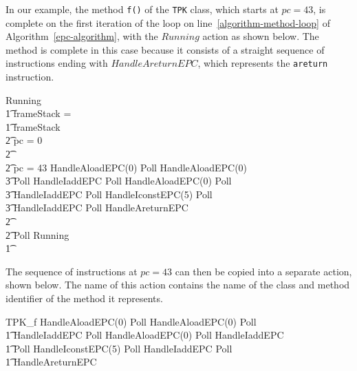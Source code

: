 In our example, the method \texttt{f()} of the \texttt{TPK} class,
which starts at $pc = 43$, is complete on the first iteration of the
loop on line~\ref{algorithm-method-loop} of
Algorithm~\ref{epc-algorithm}, with the $Running$ action as shown
below.
The method is complete in this case because it consists of a straight
sequence of instructions ending with $HandleAreturnEPC$, which
represents the \texttt{areturn} instruction.
\begin{circus}
  Running \circdef \\
  \t1 \circif frameStack = \emptyset \circthen \Skip \\
  \t1 {} \circelse frameStack \neq \emptyset \circthen {} \\
  \t2 \circif pc = 0 \circthen {} \cdots {} \\
  \t2 {} \cdots {} \\
  \t2 {} \circelse pc = 43 \circthen HandleAloadEPC(0) \circseq Poll \circseq HandleAloadEPC(0) \circseq \\
  \t3 Poll \circseq HandleIaddEPC \circseq Poll \circseq HandleAloadEPC(0) \circseq Poll \circseq \\
  \t3 HandleIaddEPC \circseq Poll \circseq HandleIconstEPC(5) \circseq Poll \circseq \\
  \t3 HandleIaddEPC \circseq Poll \circseq HandleAreturnEPC \\
  \t2 {} \cdots {} \\
  \t2 \circfi \circseq Poll \circseq Running \\
  \t1 \circfi
\end{circus}
The sequence of instructions at $pc = 43$ can then be copied into a
separate action, shown below.
The name of this action contains the name of the class and method
identifier of the method it represents.
\begin{circus}
  TPK\_f \circdef HandleAloadEPC(0) \circseq Poll \circseq HandleAloadEPC(0) \circseq Poll \circseq \\
  \t1 HandleIaddEPC \circseq Poll \circseq HandleAloadEPC(0) \circseq Poll \circseq HandleIaddEPC \circseq \\
  \t1 Poll \circseq HandleIconstEPC(5) \circseq Poll \circseq  HandleIaddEPC \circseq Poll \circseq \\
  \t1 HandleAreturnEPC 
\end{circus}

